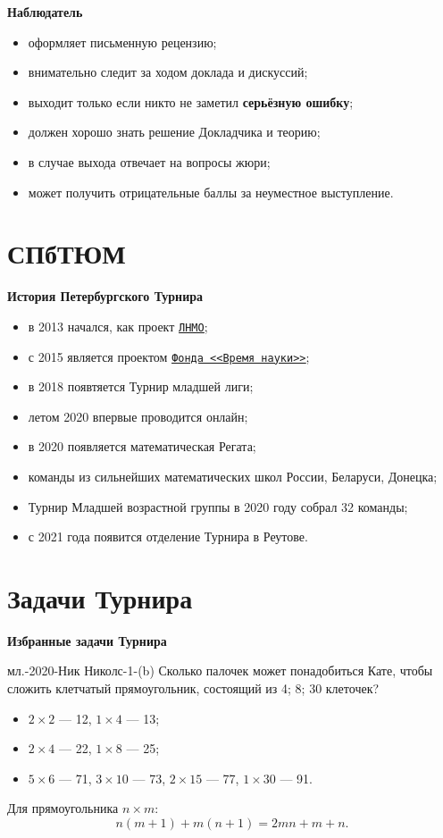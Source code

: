 \documentclass[aspectratio=1610,11pt]{beamer}
\newcommand\fram[2]{\begin{frame}{\bf #1} #2 \end{frame}}
\newcommand{\myref}[2]{\href{#1}{\texttt{\underline{#2}}}}
\def\usl#1#2{\begin{block}{#1} #2 \end{block} \medskip\pause}
\begin{document}
\fram{Наблюдатель}{
\large
\begin{itemize}
	\item оформляет письменную рецензию;\vspace{2mm}
	\item внимательно следит за ходом доклада и дискуссий;\vspace{2mm}
	\item выходит только если никто не заметил \textbf{серьёзную ошибку};\vspace{2mm}
	\item должен хорошо знать решение Докладчика  и теорию;\vspace{2mm}
	\item в случае выхода отвечает на вопросы жюри;\vspace{2mm}
	\item может получить отрицательные баллы за неуместное выступление.
\end{itemize}
}

\section{СПбТЮМ}
\fram{История Петербургского Турнира}{
\large
\begin{itemize}
	\item в 2013 начался, как проект \myref{https://lnmo.ru/}{ЛНМО};
	\item с 2015 является проектом \myref{https://timeforscience.ru/}{Фонда <<Время науки>>};
	\item в 2018 появтяется Турнир младшей лиги;
	\item летом 2020 впервые проводится онлайн;
	\item в 2020 появляется математическая Регата;
	\item команды из сильнейших математических школ России, \linebreak Беларуси, Донецка;
	\item Турнир Младшей возрастной группы в 2020 году собрал 32 команды;
	\item с 2021 года появится отделение Турнира в Реутове.
\end{itemize}
}

\section{Задачи Турнира} %
\fram{Избранные задачи Турнира}{
\usl{мл.-2020-Ник Николс-1-(b)}{
Сколько палочек может понадобиться Кате, чтобы сложить клетчатый прямоугольник, состоящий из 4; 8; 30 клеточек?
}

\begin{itemize}
	\item $2 \times 2$ --- 12, $1 \times 4$ --- 13;
	\item $2 \times 4$ --- 22, $1 \times 8$ --- 25;
	\item $5 \times 6$ --- 71, $3 \times 10$ --- 73, $2 \times 15$ --- 77, $1 \times 30$ --- 91.
\end{itemize}
\pause
Для прямоугольника $n \times m$:
$$n(m+1) + m(n+1) = 2mn + m + n.$$
}
\end{document}
